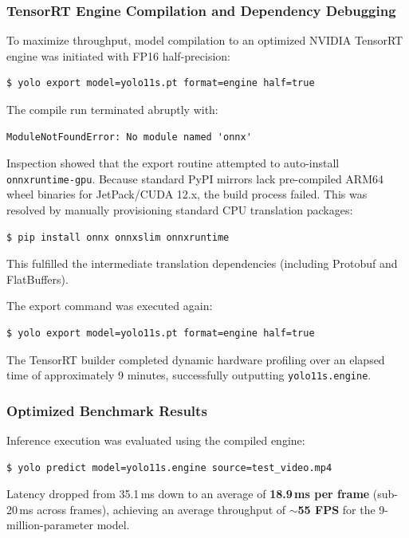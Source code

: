 \documentclass[11pt,a4paper]{article}
\begin{document}
\subsubsection{TensorRT Engine Compilation and Dependency Debugging} 
To maximize throughput, model compilation to an optimized NVIDIA TensorRT engine was initiated with FP16 half-precision: 
\begin{lstlisting}[language=bash]
$ yolo export model=yolo11s.pt format=engine half=true
\end{lstlisting}
The compile run terminated abruptly with: 
\begin{lstlisting}
ModuleNotFoundError: No module named 'onnx'
\end{lstlisting}
Inspection showed that the export routine attempted to auto-install \texttt{onnxruntime-gpu}. Because standard PyPI mirrors lack pre-compiled ARM64 wheel binaries for JetPack/CUDA 12.x, the build process failed. This was resolved by manually provisioning standard CPU translation packages: 
\begin{lstlisting}[language=bash]
$ pip install onnx onnxslim onnxruntime
\end{lstlisting}
This fulfilled the intermediate translation dependencies (including Protobuf and FlatBuffers). 

The export command was executed again: 
\begin{lstlisting}[language=bash]
$ yolo export model=yolo11s.pt format=engine half=true
\end{lstlisting}
The TensorRT builder completed dynamic hardware profiling over an elapsed time of approximately 9 minutes, successfully outputting \texttt{yolo11s.engine}.

\subsubsection{Optimized Benchmark Results} 
Inference execution was evaluated using the compiled engine: 
\begin{lstlisting}[language=bash]
$ yolo predict model=yolo11s.engine source=test_video.mp4
\end{lstlisting}
Latency dropped from 35.1\,ms down to an average of \textbf{18.9\,ms per frame} (sub-20\,ms across frames), achieving an average throughput of \textbf{$\sim$55 FPS} for the 9-million-parameter model.
\end{document}
